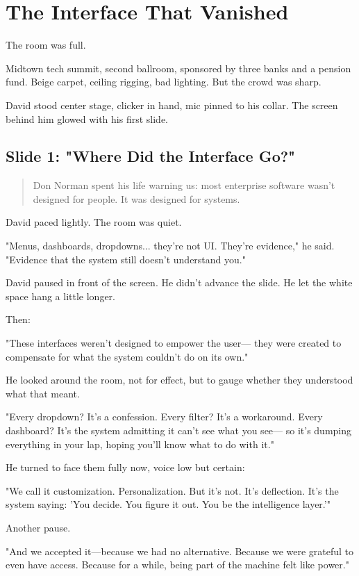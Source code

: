 \section{The Interface That Vanished}

The room was full.

Midtown tech summit, second ballroom, sponsored by three banks and a pension fund. Beige 
carpet, ceiling rigging, bad lighting. But the crowd was sharp.

David stood center stage, clicker in hand, mic pinned to his collar. The screen behind him 
glowed with his first slide.

\subsection{Slide 1: "Where Did the Interface Go?"}

\begin{quote}
Don Norman spent his life warning us: most enterprise software wasn’t designed for people. 
It was designed for systems.
\end{quote}

David paced lightly. The room was quiet.

"Menus, dashboards, dropdowns... they're not UI. They're evidence," he said. "Evidence that 
the system still doesn't understand you."

David paused in front of the screen. He didn’t advance the slide.
He let the white space hang a little longer.

Then:

"These interfaces weren’t designed to empower the user—
they were created to compensate for what the system couldn’t do on its own."

He looked around the room, not for effect, but to gauge whether they understood what that meant.

"Every dropdown? It's a confession.
Every filter? It's a workaround.
Every dashboard? It's the system admitting it can’t see what you see—
so it’s dumping everything in your lap, hoping you’ll know what to do with it."

He turned to face them fully now, voice low but certain:

"We call it customization. Personalization.
But it’s not.
It’s deflection.
It’s the system saying: 'You decide. You figure it out. You be the intelligence layer.'"

Another pause.

"And we accepted it—because we had no alternative.
Because we were grateful to even have access.
Because for a while, being part of the machine felt like power."

